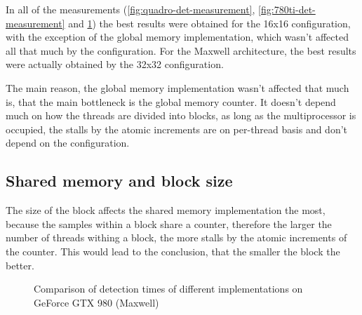 In all of the measurements (\ref{fig:quadro-det-measurement}, \ref{fig:780ti-det-measurement} and \ref{fig:980-det-measurement}) the best results were obtained for the 16x16 configuration, with the exception of the global memory implementation, which wasn't affected all that much by the configuration. For the Maxwell architecture, the best results were actually obtained by the 32x32 configuration.

The main reason, the global memory implementation wasn't affected that much is, that the main bottleneck is the global memory counter. It doesn't depend much on how the threads are divided into blocks, as long as the multiprocessor is occupied, the stalls by the atomic increments are on per-thread basis and don't depend on the configuration.

\subsection{Shared memory and block size}

The size of the block affects the shared memory implementation the most, because the samples within a block share a counter, therefore the larger the number of threads withing a block, the more stalls by the atomic increments of the counter. This would lead to the conclusion, that the smaller the block the better.

\begin{figure}[ht]
	\label{fig:980-det-measurement}
\centering{}
	\caption{Comparison of detection times of different implementations on GeForce GTX 980 (Maxwell)}
\end{figure}

